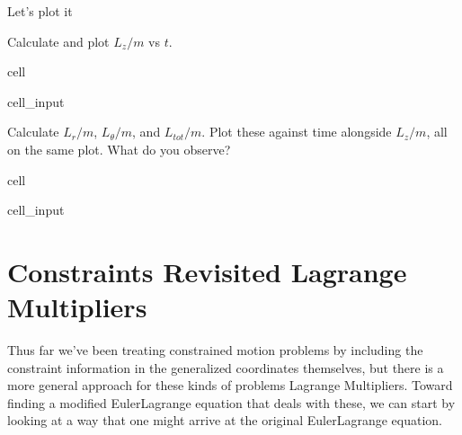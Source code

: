 \documentclass[letterpaper,10pt,english]{jupyterBook}
\begin{document}
\sphinxAtStartPar
Let’s plot it

\sphinxAtStartPar
{}

\sphinxAtStartPar
Calculate and plot \(L_z /m\) vs \(t\).

\begin{sphinxuseclass}{cell}\begin{sphinxVerbatimInput}

\begin{sphinxuseclass}{cell_input}
\begin{sphinxVerbatim}[commandchars=\\\{\}]
\end{sphinxVerbatim}

\end{sphinxuseclass}\end{sphinxVerbatimInput}

\end{sphinxuseclass}
\sphinxAtStartPar
{}

\sphinxAtStartPar
Calculate \(L_r /m\), \(L_\theta / m\), and \(L_{tot} /m\). Plot these against time alongside \(L_z/m\), all on the same plot. What do you observe?

\begin{sphinxuseclass}{cell}\begin{sphinxVerbatimInput}

\begin{sphinxuseclass}{cell_input}
\begin{sphinxVerbatim}[commandchars=\\\{\}]
\end{sphinxVerbatim}

\end{sphinxuseclass}\end{sphinxVerbatimInput}

\end{sphinxuseclass}

\section{Constraints Revisited \sphinxhyphen{} Lagrange Multipliers}
\label{\detokenize{content/1_mechanics/lagrange_2:constraints-revisited-lagrange-multipliers}}
\sphinxAtStartPar
Thus far we’ve been treating constrained motion problems by including the constraint information in the generalized coordinates themselves, but there is a more general approach for these kinds of problems \sphinxhyphen{} Lagrange Multipliers. Toward finding a modified Euler\sphinxhyphen{}Lagrange equation that deals with these, we can start by looking at a way that one might arrive at the original Euler\sphinxhyphen{}Lagrange equation.
\end{document}
